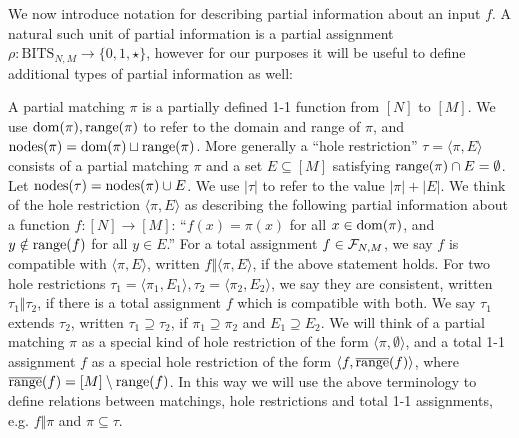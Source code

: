 We now introduce notation for describing partial information about an input $f$. A natural such unit of partial information is a partial assignment $\rho : \mathrm{BITS}_{N,M} \to \{0,1,\star\}$, however for our purposes it will be useful to define additional types of partial information as well:

\begin{definition}
A partial matching $\pi$ is a partially defined 1-1 function from $[N]$ to $[M]$. We use $\mathrm{dom}(\pi), \mathrm{range}(\pi)$ to refer to the domain and range of $\pi$, and $\mathrm{nodes}(\pi)= \mathrm{dom}(\pi) \sqcup \mathrm{range}(\pi)$. More generally a ``hole restriction'' $\tau = \langle \pi, E\rangle$ consists of a partial matching $\pi$ and a set $E \subseteq [M]$ satisfying $\mathrm{range}(\pi) \cap E = \emptyset$.  Let $\mathrm{nodes}(\tau) = \mathrm{nodes}(\pi) \cup E$. We use $|\tau|$ to refer to the value $|\pi| + |E|$. We think of the hole restriction $\langle \pi, E\rangle$ as describing the following partial information about a function $f: [N] \to [M]$: ``$f(x) = \pi(x)$ for all $x \in \mathrm{dom}(\pi)$, and $y \notin \mathrm{range}(f)$ for all $y \in E$.''  For a total assignment $f \in {\cal F}_{N,M}$, we say $f$ is compatible with $\langle \pi, E\rangle$, written $f \Vert \langle \pi, E\rangle$, if the above statement holds. For two hole restrictions $\tau_1=\langle \pi_1,E_1\rangle, \tau_2=\langle \pi_2,E_2\rangle$, we say they are consistent, written $\tau_1 \Vert \tau_2$, if there is a total assignment $f$ which is compatible with both. We say $\tau_1$ extends $\tau_2$, written $\tau_1\supseteq \tau_2$, if $\pi_1 \supseteq \pi_2$ and $E_1 \supseteq E_2$. We will think of a partial matching $\pi$ as a special kind of hole restriction of the form $\langle \pi, \emptyset\rangle$, and a total 1-1 assignment $f$ as a special hole restriction of the form $\langle f, \overline{\mathrm{range}}(f)\rangle$, where $\overline{\mathrm{range}}(f)= [M] \setminus \mathrm{range}(f)$. In this way we will use the above terminology to define relations between matchings, hole restrictions and total 1-1 assignments, e.g. $f \Vert \pi$ and $\pi \subseteq \tau$. 

\end{definition}

